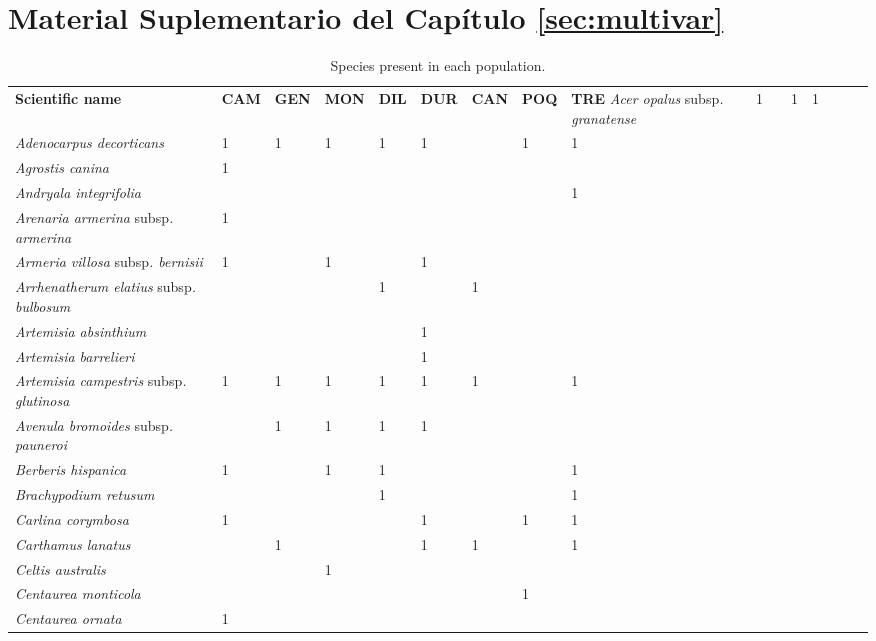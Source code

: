 %
\chapter{\textcolor{ctcolormain}{Material Suplementario del Capítulo \ref{sec:multivar}}}\label{sec:appendix:multivar}

{%
\scriptsize
\begin{longtable}{llllllllll}
\caption{Species present in each population.}\label{tab:multivar-s1}\\ 
\toprule
 \textbf{Scientific name}  & \textbf{CAM}  & \textbf{GEN}  & \textbf{MON}  & \textbf{DIL}  & \textbf{DUR}  & \textbf{CAN}  & \textbf{POQ}  & \textbf{TRE}  \endfirsthead 
\hline
\textit{Acer opalus }subsp\textit{. granatense}  & 1 &  & 1 & 1 &  &  &  &  \\
\textit{Adenocarpus decorticans}  & 1 & 1 & 1 & 1 & 1 &  & 1 & 1 \\
\textit{Agrostis canina}  & 1 &  &  &  &  &  &  &  \\
\textit{Andryala integrifolia}  &  &  &  &  &  &  &  & 1 \\
\textit{Arenaria armerina }subsp\textit{. armerina}  & 1 &  &  &  &  &  &  &  \\
\textit{Armeria villosa }subsp\textit{. bernisii}  & 1 &  & 1 &  & 1 &  &  &  \\
\textit{Arrhenatherum elatius }subsp\textit{. bulbosum}  &  &  &  & 1 &  & 1 &  &  \\
\textit{Artemisia absinthium}  &  &  &  &  & 1 &  &  &  \\
\textit{Artemisia barrelieri}  &  &  &  &  & 1 &  &  &  \\
\textit{Artemisia campestris }subsp\textit{. glutinosa}  & 1 & 1 & 1 & 1 & 1 & 1 &  & 1 \\
\textit{Avenula bromoides }subsp\textit{. pauneroi}  &  & 1 & 1 & 1 & 1 &  &  &  \\
\textit{Berberis hispanica}  & 1 &  & 1 & 1 &  &  &  & 1 \\
\textit{Brachypodium retusum}  &  &  &  & 1 &  &  &  & 1 \\
\textit{Carlina corymbosa}  & 1 &  &  &  & 1 &  & 1 & 1 \\
\textit{Carthamus lanatus}  &  & 1 &  &  & 1 & 1 &  & 1 \\
\textit{Celtis australis}  &  &  & 1 &  &  &  &  &  \\
\textit{Centaurea monticola}  &  &  &  &  &  &  & 1 &  \\
\textit{Centaurea ornata}  & 1 &  &  &  &  &  &  &  \\

\end{longtable}}
